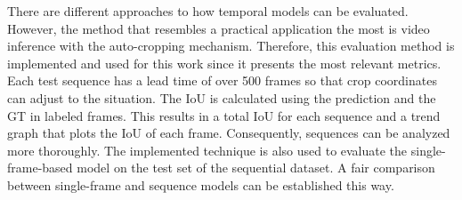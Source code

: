 There are different approaches to how temporal models can be evaluated.
However, the method that resembles a practical application the most is video inference with the auto-cropping mechanism.
Therefore, this evaluation method is implemented and used for this work since it presents the most relevant metrics.
Each test sequence has a lead time of over 500 frames so that crop coordinates can adjust to the situation.
The \ac{IoU} is calculated using the prediction and the \ac{GT} in labeled frames.
This results in a total \ac{IoU} for each sequence and a trend graph that plots the \ac{IoU} of each frame.
Consequently, sequences can be analyzed more thoroughly.
The implemented technique is also used to evaluate the single-frame-based model on the test set of the sequential dataset.
A fair comparison between single-frame and sequence models can be established this way.